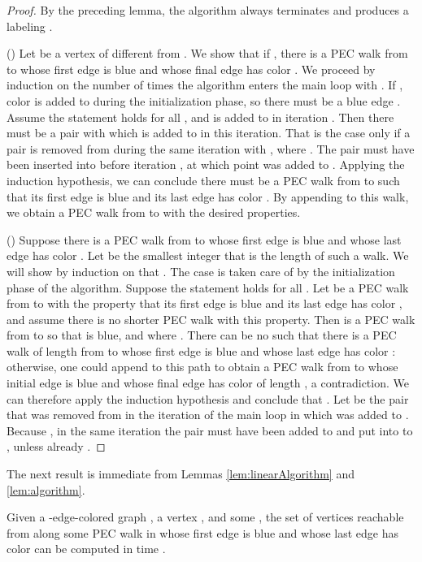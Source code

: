 \documentclass{llncs}
\def\hy{\hbox{-}\nobreak\hskip0pt} \newcommand{\ellipsis}{}
\begin{document}
\begin{proof} 
  By the preceding lemma, the algorithm always terminates and produces a
  labeling .

  () Let  be a vertex of  different from . We show that
  if , there is a PEC walk from  to  whose first edge is
  blue and whose final edge has color . We proceed by induction on the
  number  of times the algorithm enters the main loop with . If , color  is added to  during the
  initialization phase, so there must be a blue edge . Assume the
  statement holds for all , and  is added to  in
  iteration . Then there must be a pair  with 
  which is added to  in this iteration. That is the case only if a pair
   is removed from  during the same iteration with , where . The pair  must have been inserted into 
  before iteration , at which point  was added to . Applying
  the induction hypothesis, we can conclude there must be a PEC walk from 
  to  such that its first edge is blue and its last edge has color . By
  appending  to this walk, we obtain a PEC walk from  to  with the
  desired properties.

  () Suppose there is a PEC walk from  to  whose first edge
  is blue and whose last edge has color . Let  be the smallest integer
  that is the length of such a walk. We will show by induction on  that . The case  is taken care of by the initialization phase
  of the algorithm. Suppose the statement holds for all . Let  be a PEC walk from  to  with the
  property that its first edge is blue and its last edge has color , and
  assume there is no shorter PEC walk with this property. Then
   is a PEC walk from  to  so that  is
  blue, and  where . There can be no  such that there is a PEC walk of length  from  to  whose
  first edge is blue and whose last edge has color : otherwise, one could
  append  to this path to obtain a PEC walk from  to
   whose initial edge is blue and whose final edge has color  of
  length , a contradiction. We can therefore apply the
  induction hypothesis and conclude that . Let 
  be the pair that was removed from  in the iteration of the main loop in
  which  was added to . Because , in the same
  iteration the pair  must have been added to  and  put
  into to , unless already .
\end{proof}
The next result is immediate from Lemmas \ref{lem:linearAlgorithm} and
\ref{lem:algorithm}.
\begin{proposition}\label{prop:reachable}
  Given a \hy edge\hy colored graph , a vertex , and some , the set of vertices reachable from
   along some PEC walk in  whose first edge is blue and whose last edge
  has color  can be computed in time
  .
\end{proposition}
\end{document}
